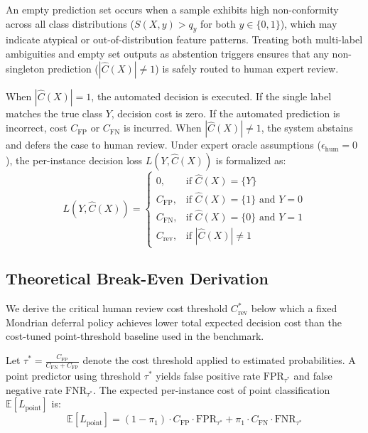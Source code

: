 \documentclass{ieeetj}
\begin{document}
An empty prediction set occurs when a sample exhibits high non-conformity across all class distributions ($S(X,y) > q_y$ for both $y \in \{0,1\}$), which may indicate atypical or out-of-distribution feature patterns. Treating both multi-label ambiguities and empty set outputs as abstention triggers ensures that any non-singleton prediction ($|\hat{C}(X)| \neq 1$) is safely routed to human expert review.

When $|\hat{C}(X)| = 1$, the automated decision is executed. If the single label matches the true class $Y$, decision cost is zero. If the automated prediction is incorrect, cost $C_{\mathrm{FP}}$ or $C_{\mathrm{FN}}$ is incurred. When $|\hat{C}(X)| \neq 1$, the system abstains and defers the case to human review. Under expert oracle assumptions ($\epsilon_{\mathrm{hum}} = 0$), the per-instance decision loss $L(Y, \hat{C}(X))$ is formalized as:
\begin{equation}
L(Y, \hat{C}(X)) = \begin{cases}
0, & \text{if } \hat{C}(X) = \{Y\} \\
C_{\mathrm{FP}}, & \text{if } \hat{C}(X) = \{1\} \text{ and } Y = 0 \\
C_{\mathrm{FN}}, & \text{if } \hat{C}(X) = \{0\} \text{ and } Y = 1 \\
C_{\mathrm{rev}}, & \text{if } |\hat{C}(X)| \neq 1
\end{cases}
\end{equation}

\subsection{Theoretical Break-Even Derivation}
We derive the critical human review cost threshold $C_{\mathrm{rev}}^*$ below which a fixed Mondrian deferral policy achieves lower total expected decision cost than the cost-tuned point-threshold baseline used in the benchmark.

Let $\tau^* = \frac{C_{\mathrm{FP}}}{C_{\mathrm{FN}} + C_{\mathrm{FP}}}$ denote the cost threshold applied to estimated probabilities. A point predictor using threshold $\tau^*$ yields false positive rate $\mathrm{FPR}_{\tau^*}$ and false negative rate $\mathrm{FNR}_{\tau^*}$. The expected per-instance cost of point classification $\mathbb{E}[L_{\text{point}}]$ is:
\begin{equation}
\mathbb{E}[L_{\text{point}}] = (1-\pi_1) \cdot C_{\mathrm{FP}} \cdot \mathrm{FPR}_{\tau^*} + \pi_1 \cdot C_{\mathrm{FN}} \cdot \mathrm{FNR}_{\tau^*}
\end{equation}
\end{document}
